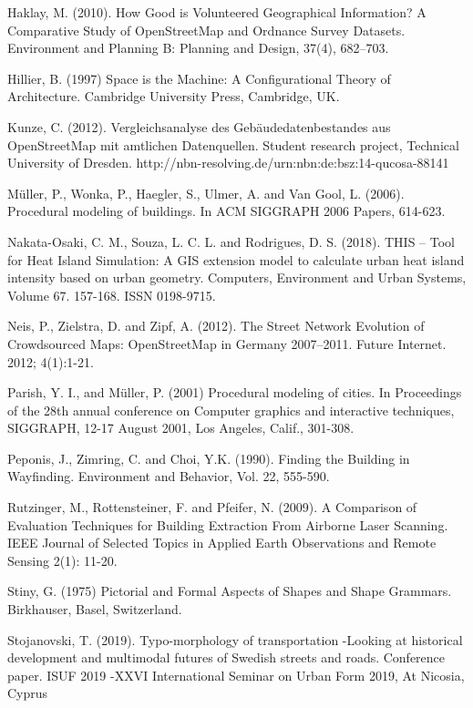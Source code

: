 \documentclass{kththesis}
\begin{document}
\begin{thebibliography}{9}
Haklay, M. (2010). How Good is Volunteered Geographical Information? A Comparative Study of OpenStreetMap and Ordnance Survey Datasets. Environment and Planning B: Planning and Design, 37(4), 682–703.

Hillier, B. (1997) Space is the Machine: A Configurational Theory of Architecture. Cambridge University Press, Cambridge, UK.

Kunze, C. (2012). Vergleichsanalyse des Gebäudedatenbestandes aus OpenStreetMap mit amtlichen Datenquellen. Student research project, Technical University of Dresden. http://nbn-resolving.de/urn:nbn:de:bsz:14-qucosa-88141

Müller, P., Wonka, P., Haegler, S., Ulmer, A. and Van Gool, L. (2006). Procedural modeling of buildings. In ACM SIGGRAPH 2006 Papers, 614-623.

Nakata-Osaki, C. M., Souza, L. C. L. and Rodrigues, D. S. (2018). THIS – Tool for Heat Island Simulation: A GIS extension model to calculate urban heat island intensity based on urban geometry. Computers, Environment and Urban Systems, Volume 67. 157-168. ISSN 0198-9715.

Neis, P., Zielstra, D. and Zipf, A. (2012). The Street Network Evolution of Crowdsourced Maps: OpenStreetMap in Germany 2007–2011. Future Internet. 2012; 4(1):1-21.

Parish, Y. I., and Müller, P. (2001) Procedural modeling of cities. In Proceedings of the 28th annual conference on Computer graphics and interactive techniques, SIGGRAPH, 12-17 August 2001, Los Angeles, Calif., 301-308.

Peponis, J., Zimring, C. and Choi, Y.K. (1990). Finding the Building in Wayfinding. Environment and Behavior, Vol. 22, 555-590.

Rutzinger, M., Rottensteiner, F. and Pfeifer, N. (2009). A Comparison of Evaluation Techniques for Building Extraction From Airborne Laser Scanning. IEEE Journal of Selected Topics in Applied Earth Observations and Remote Sensing 2(1): 11-20.

Stiny, G. (1975) Pictorial and Formal Aspects of Shapes and Shape Grammars. Birkhauser, Basel, Switzerland.

Stojanovski, T. (2019). Typo-morphology of transportation -Looking at historical development and multimodal futures of Swedish streets and roads. Conference paper. ISUF 2019 -XXVI International Seminar on Urban Form 2019, At Nicosia, Cyprus


\end{thebibliography}
\end{document}
